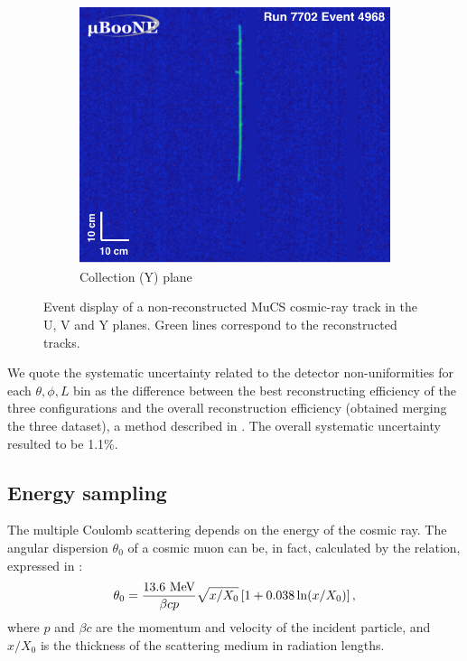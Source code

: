 \documentclass[a4paper]{scrartcl}
\begin{document}
\begin{figure}[htbp]
\begin{center}
    \begin{subfigure}{0.3\textwidth}
      \includegraphics[width=\linewidth]{figures/y.png}
      \caption{Collection (Y) plane} \label{fig:y}
    \end{subfigure}    \caption{Event display of a non-reconstructed MuCS cosmic-ray track in the U, V and Y planes. Green lines correspond to the reconstructed tracks.} \label{fig:example}
  \end{center}
\end{figure}

We quote the systematic uncertainty related to the detector non-uniformities for each $\theta,\phi,L$ bin as the difference between the best reconstructing efficiency of the three configurations and the overall reconstruction efficiency (obtained merging the three dataset), a method described in \cite{besiii}. The overall systematic uncertainty resulted to be 1.1\%.

\subsection{Energy sampling}
The multiple Coulomb scattering depends on the energy of the cosmic ray. The angular dispersion $\theta_{0}$ of a cosmic muon can be, in fact, calculated by the relation, expressed in \cite{pdg}:
\begin{equation}
\theta_{0} = \frac{13.6~\mathrm{MeV}}{\beta c p}\sqrt{x/X_{0}}\left[1+0.038\thinspace\mathrm{ln}(x/X_0)\right],
\end{equation}
where $p$ and $\beta c$ are the momentum and velocity of the incident particle, and $x/X_0$ is the thickness of the scattering medium in radiation lengths.
\end{document}
